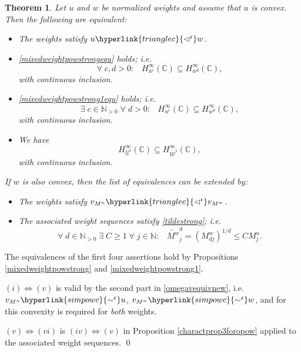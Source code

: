 \documentclass[10pt]{amsart}%
\numberwithin{equation}{section}
\theoremstyle{plain}
\newtheorem{theorem}[proposition]{Theorem}
\newcommand{\CC}{\mathbb{C}}
\newcommand{\NN}{\mathbb{N}}
\begin{document}
\begin{theorem}\label{littleoweightfctcharactpow}
	Let $u$ and $w$ be normalized weights and assume that $u$ is convex. Then the following are equivalent:
	\begin{itemize}
		\item[$(i)$] The weights satisfy $u\hyperlink{trianglec}{\vartriangleleft^{\mathfrak{c}}}w$.
		
		\item[$(ii)$] \eqref{mixedweightpowstrongequ} holds; i.e.
		$$\forall\;c,d>0:\;\;\;H^{\infty}_{u^c}(\CC)\subseteq H^{\infty}_{w^d}(\CC),$$
		with continuous inclusion.
		
		\item[$(iii)$] \eqref{mixedweightpowstrong1equ} holds; i.e.
		$$\exists\;c\in\NN_{>0}\;\forall\;d>0:\;\;\;H^{\infty}_{u^c}(\CC)\subseteq H^{\infty}_{w^d}(\CC),$$
		with continuous inclusion.
		
		\item[$(iv)$] We have
		$$H^{\infty}_{\underline{\mathcal{U}}^{\mathfrak{c}}}(\CC)\subseteq H^{\infty}_{\overline{\mathcal{W}}^{\mathfrak{c}}}(\CC),$$
		with continuous inclusion.
	\end{itemize}
	
	If $w$ is also convex, then the list of equivalences can be extended by:
	\begin{itemize}
		\item[$(v)$] The weights satisfy $v_{M^u}\hyperlink{trianglec}{\vartriangleleft^{\mathfrak{c}}}v_{M^w}$.
		
		\item[$(vi)$] The associated weight sequences satisfy \eqref{tildestrong}; i.e.
		$$\forall\;d\in\NN_{>0}\;\exists\;C\ge 1\;\forall\;j\in\NN:\;\;\;\widetilde{M^w}^d_j=(M^w_{dj})^{1/d}\le CM^u_j.$$
	\end{itemize}
\end{theorem}

The equivalences of the first four assertions hold by Propositions \ref{mixedweightpowstrong} and \ref{mixedweightpowstrong1}.

$(i)\Leftrightarrow(v)$ is valid by the second part in \eqref{omegavequivnew}, i.e. $v_{M^u}\hyperlink{simpowc}{\sim^{\mathfrak{c}}}u$, $v_{M^w}\hyperlink{simpowc}{\sim^{\mathfrak{c}}}w$, and for this convexity is required for \emph{both} weights.

$(v)\Leftrightarrow(vi)$ is $(iv)\Leftrightarrow(v)$ in Proposition \ref{charactprop3foropow} applied to the associated weight sequences.
\qed\enddemo
\end{document}
